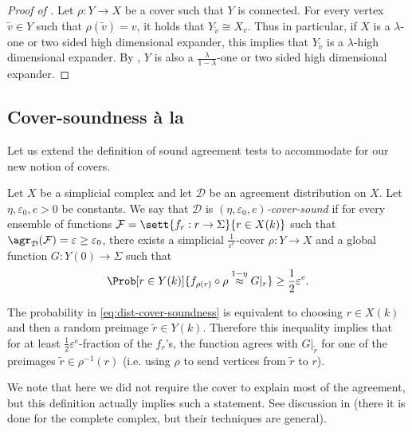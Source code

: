 \begin{proof}[Proof of ]
    Let \(\rho:Y \to X\) be a cover such that \(Y\) is connected. For every vertex \(\tilde{v} \in Y\) such that \(\rho(\tilde{v})=v\), it holds that \(Y_{\tilde{v}} \cong X_v\). Thus in particular, if \(X\) is a \(\lambda\)-one or two sided high dimensional expander, this implies that \(Y_{\tilde{v}}\) is a \(\lambda\)-high dimensional expander. By , \(Y\) is also a \(\frac{\lambda}{1-\lambda}\)-one or two sided high dimensional expander.
\end{proof}

\subsection[Cover soundness à la (CLA)]{Cover-soundness à la }
Let us extend the definition of sound agreement tests to accommodate for our new notion of covers.
\begin{definition} \label{def:distribution-cover-soundness}
    Let \(X\) be a simplicial complex and let \(\mathcal{D}\) be an agreement distribution on \(X\). Let \(\eta,\varepsilon_0,e > 0\) be constants. We say that \(\mathcal{D}\) is \emph{\((\eta,\varepsilon_0,e)\)-cover-sound} if for every ensemble of functions \(\mathcal{F} = \sett{f_r:r \to \Sigma}{r \in X(k)}\) such that \(\agr_{\mathcal{D}}(\mathcal{F}) = \varepsilon \geq \varepsilon_0\),
    there exists a simplicial $\frac{1}{\varepsilon^e}$-cover \(\rho:Y \to X\) and a global function \(G:Y(0)\to \Sigma\) such that 
    \begin{equation} \label{eq:dist-cover-soundness}
        \Prob[r \in Y(k)]{f_{\rho(r)}\circ \rho \overset{1-\eta}{\approx} G|_r} \geq \frac{1}{2}\varepsilon^e.
    \end{equation}
\end{definition}
The probability in \eqref{eq:dist-cover-soundness} is equivalent to choosing \(r \in X(k)\) and then a random preimage \(\tilde{r} \in Y(k)\). Therefore this inequality implies that for at least \(\frac{1}{2}\varepsilon^e\)-fraction of the \(f_r\)'s, the function agrees with \(G|_{\tilde{r}}\) for one of the preimages \(\tilde{r} \in \rho^{-1}(r)\) (i.e. using \(\rho\) to send vertices from \(\tilde{r}\) to \(r\)).

We note that here we did not require the cover to explain most of the agreement, but this definition actually implies such a statement. See discussion in \cite{DinurG2008} (there it is done for the complete complex, but their techniques are general).

